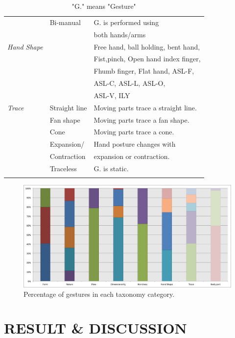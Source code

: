 \documentclass{sigchi}
\begin{document}
\begin{table}
\begin{adjustwidth}{-0.4cm}{}
\begin{tabular}{|l|l|l|}
    &Bi-manual&G. is performed using \\&&both hands/arms\\
    \Xhline{4\arrayrulewidth}
    \em{Hand Shape} &&Free hand, ball holding, bent hand,\\&& Fist,pinch, Open hand
    index finger,\\&&Fhumb finger, Flat hand, ASL-F,\\&&ASL-C, ASL-L, ASL-O, \\&&ASL-V, ILY\\
    \Xhline{4\arrayrulewidth}
    \em{Trace}&Straight line&Moving parts trace a straight line.\\ \cline{2-3}
    &Fan shape&Moving parts trace a fan shape.\\ \cline{2-3}
    &Cone&Moving parts trace a cone.\\ \cline{2-3}
    &Expansion/&Hand posture changes with \\&Contraction&expansion or contraction.\\
     \cline{2-3}
    &Traceless&G. is static.\\
    \Xhline{4\arrayrulewidth}
  \end{tabular}
  \caption{"G." means "Gesture"}
  \label{tab:classificationTable}
  \end{adjustwidth}
\end{table}

\begin{figure}[!h]
\centering
\includegraphics[width=1\columnwidth]{taxonomyFigure.png}
\caption{Percentage of gestures in each taxonomy category.}
\label{fig:taxonomyFigure}
\end{figure}

\section{RESULT \& DISCUSSION}
\end{document}
